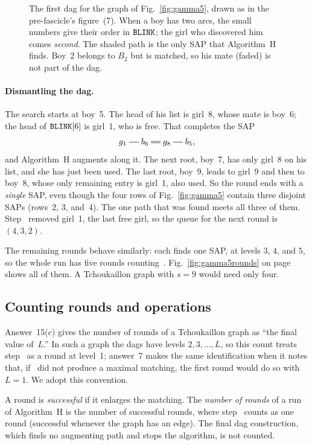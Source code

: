 \begin{figure}[ht]
\centering

\caption{The first dag for the graph of Fig.~\ref{fig:gamma5}, drawn as
in the pre-fascicle's figure~(7). When a boy has two arcs, the small
numbers give their order in $\texttt{BLINK}$; the girl who discovered him
comes \emph{second}. The shaded path is the only SAP that Algorithm~H
finds. Boy~2 belongs to $B_2$ but is matched, so his mate (faded) is
not part of the dag.}
\label{fig:gamma5dag}
\end{figure}

\paragraph{Dismantling the dag.}
The search starts at boy~5. The head of his list is girl~8, whose mate
is boy~6; the head of $\texttt{BLINK}[6]$ is girl~1, who is free. That
completes the SAP
\[
    g_1\sg b_6\db g_8\sg b_5 ,
\]
and Algorithm~H augments along it. The next root, boy~7, has only
girl~8 on his list, and she has just been used. The last root, boy~9,
leads to girl~9 and then to boy~8, whose only remaining entry is
girl~1, also used. So the round ends with a \emph{single} SAP, even
though the four rows of Fig.~\ref{fig:gamma5} contain three disjoint
SAPs (rows~2, 3, and~4). The one path that was found meets all three
of them. Step~ removed girl~1, the last free girl, so the queue
for the next round is $(4,3,2)$.

The remaining rounds behave similarly: each finds one SAP, at levels
$3$, $4$, and $5$, so the whole run has five rounds counting~.
Fig.~\ref{fig:gamma5rounds} on page~\pageref{fig:gamma5rounds} shows
all of them. A Tchoukaillon graph with $s=9$ would need only four.

\subsection{Counting rounds and operations}
\label{sec:counting}

Answer~15(c) gives the number of rounds of a Tchoukaillon graph as
``the final value of~$L$.'' In such a graph the dags have levels
$2,3,\ldots,L$, so this count treats step~ as a round at level~1;
answer~7 makes the same identification when it notes that, if~ did
not produce a maximal matching, the first round would do so with $L=1$.
We adopt this convention.

\begin{definition}
A round is \emph{successful} if it enlarges the matching. The
\emph{number of rounds} of a run of Algorithm~H is the number of
successful rounds, where step~ counts as one round (successful
whenever the graph has an edge). The final dag construction, which
finds no augmenting path and stops the algorithm, is not counted.
\end{definition}

